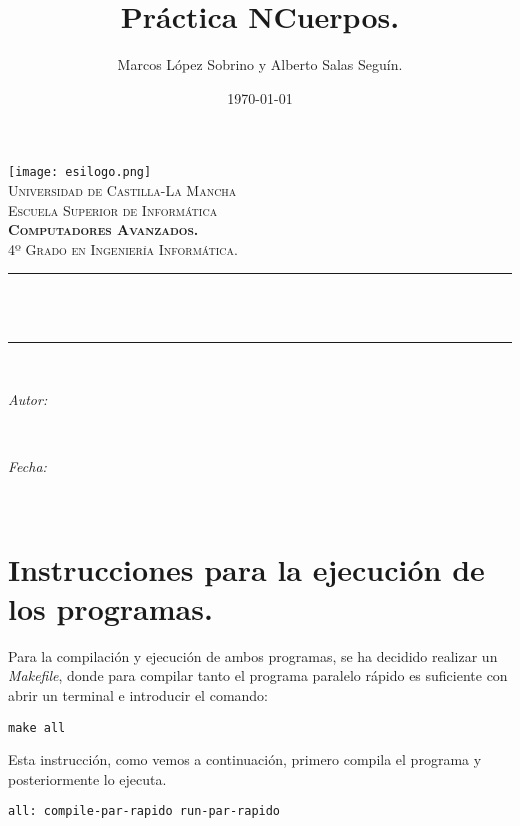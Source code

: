 \documentclass[11pt]{article}
\title{Práctica NCuerpos.}							%
\author{Marcos López Sobrino y Alberto Salas Seguín.}							%
\date{\today}											%
\makeatletter
\newcommand{\subject}{Computadores Avanzados.}						%
\newcommand{\course}{4º Grado en Ingeniería Informática.}		%
\newcommand{\dateText}{Fecha:}
\newcommand{\dateText}{Date:}
\let\thetitle\@title
\let\theauthor\@author
\let\thedate\@date
\makeatother
\begin{document}
\begin{titlepage}
	\centering
    \texttt{[image: esilogo.png]}\\[1.0 cm]	%
    \textsc{\LARGE Universidad de Castilla-La Mancha}\\[0.5 cm]	%
    \textsc{\LARGE Escuela Superior de Informática}\\[2.0 cm]
	\textsc{\Large \textbf{\subject}}\\[0.5 cm]				%
	\textsc{\large \course}\\[0.5 cm]						%
	\rule{\linewidth}{0.2 mm} \\[0.4 cm]
	{ \huge \bfseries \thetitle}\\
	\rule{\linewidth}{0.2 mm} \\[1.5 cm]
	
	\begin{minipage}{0.4\textwidth}
		\begin{flushleft} \large
			\emph{Autor:}\\
			\textbf{\theauthor}
			\end{flushleft}
			\end{minipage}~
			\begin{minipage}{0.4\textwidth}
			\begin{flushright} \large
			\emph{\dateText} \\
			\thedate
		\end{flushright}
	\end{minipage}\\[1.5 cm]
 
	\vfill
	
\end{titlepage}

\tableofcontents
\newpage

\section{Instrucciones para la ejecución de los programas.}
Para la compilación y ejecución de ambos programas, se ha decidido realizar un \textit{Makefile}, donde para compilar tanto el programa paralelo rápido es suficiente con abrir un terminal e introducir el comando:
\begin{lstlisting}[style=C, numbers=none]
make all
\end{lstlisting}
Esta instrucción, como vemos a continuación, primero compila el programa y posteriormente lo ejecuta.
\begin{lstlisting}[style=C, numbers=none]
all: compile-par-rapido run-par-rapido
\end{lstlisting}
\end{document}
